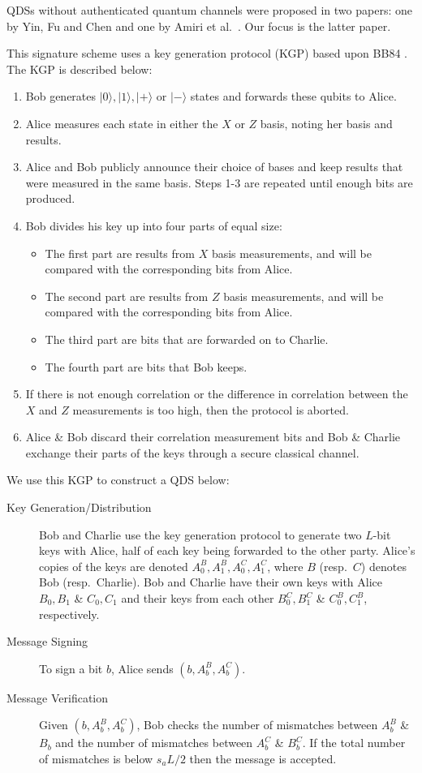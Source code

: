 \documentclass[%
 reprint,
 amsmath,amssymb,
 aps,
 pra,
]{revtex4-1}
\begin{document}
QDSs without authenticated quantum channels were proposed in two papers: one by Yin, Fu and Chen \cite{PhysRevA.93.032316} and one by Amiri et al.\ \cite{PhysRevA.93.032325}. Our focus is the latter paper.

This signature scheme uses a key generation protocol (KGP) based upon BB84 \cite{BB84}. The KGP is described below:

\begin{enumerate}
\item Bob generates $|0\rangle, |1\rangle, |+\rangle \text{ or } |-\rangle$ states and forwards these qubits to Alice.
\item Alice measures each state in either the $X$ or $Z$ basis, noting her basis and results.
\item Alice and Bob publicly announce their choice of bases and keep results that were measured in the same basis. Steps 1-3 are repeated until enough bits are produced.
\item Bob divides his key up into four parts of equal size:
\begin{itemize}
\item The first part are results from $X$ basis measurements, and will be compared with the corresponding bits from Alice.
\item The second part are results from $Z$ basis measurements, and will be compared with the corresponding bits from Alice.
\item The third part are bits that are forwarded on to Charlie.
\item The fourth part are bits that Bob keeps.
\end{itemize}
\item If there is not enough correlation or the difference in correlation between the $X$ and $Z$ measurements is too high, then the protocol is aborted.
\item Alice \& Bob discard their correlation measurement bits and Bob \& Charlie exchange their parts of the keys through a secure classical channel.
\end{enumerate}

We use this KGP to construct a QDS below:

\begin{description}
\item[Key Generation/Distribution]Bob and Charlie use the key generation protocol to generate two $L$-bit keys with Alice, half of each key being forwarded to the other party. Alice's copies of the keys are denoted $A^B_0, A^B_1, A^C_0, A^C_1$, where $B$ (resp.\ $C$) denotes Bob (resp.\ Charlie). Bob and Charlie have their own keys with Alice $B_0, B_1$ \& $C_0, C_1$ and their keys from each other $B^C_0, B^C_1$ \& $C^B_0, C^B_1$, respectively.
\item[Message Signing]To sign a bit $b$, Alice sends $(b, A^B_b, A^C_b)$.
\item[Message Verification]Given $(b, A^B_b, A^C_b)$, Bob checks the number of mismatches between $A^B_b$ \& $B_b$ and the number of mismatches between $A^C_b$ \& $B^C_b$. If the total number of mismatches is below $s_aL/2$ then the message is accepted.
\end{description}
\end{document}
